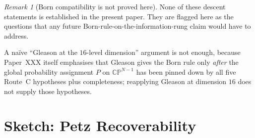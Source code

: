 \documentclass[12pt]{article}
\theoremstyle{definition}
\theoremstyle{remark}
\newtheorem{remark}[theorem]{Remark}
\begin{document}
\begin{remark}[Born compatibility is not proved here]
None of these descent statements is established in the present paper. They are flagged here as the questions that any future Born-rule-on-the-information-rung claim would have to address.

A na\"ive ``Gleason at the $16$-level dimension'' argument is not enough, because Paper~XXX itself emphasises that Gleason gives the Born rule only \emph{after} the global probability assignment $P$ on $\mathbb{CP}^{N-1}$ has been pinned down by all five Route~C hypotheses plus completeness; reapplying Gleason at dimension $16$ does not supply those hypotheses.
\end{remark}

\section{Sketch: Petz Recoverability}\label{sec:petz}
\end{document}
